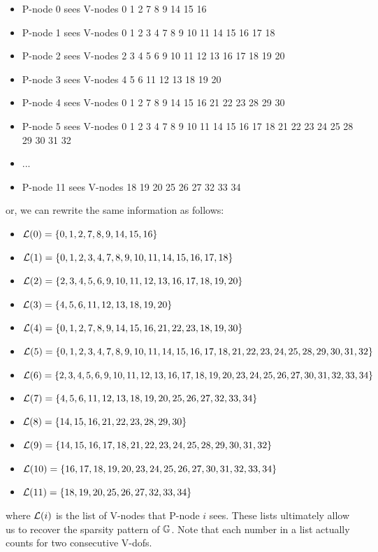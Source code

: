 \begin{itemize}
\item P-node 0 sees V-nodes 0 1 2 7 8 9 14 15 16
\item P-node 1 sees V-nodes 0 1 2 3 4 7 8 9 10 11 14 15 16 17 18 
\item P-node 2 sees V-nodes 2 3 4 5 6 9 10 11 12 13 16 17 18 19 20
\item P-node 3 sees V-nodes 4 5 6 11 12 13 18 19 20
\item P-node 4 sees V-nodes 0 1 2 7 8 9 14 15 16 21 22 23 28 29 30
\item P-node 5 sees V-nodes 0 1 2 3 4 7 8 9 10 11 14 15 16 17 18 21 22 23 24 25 28 29 30 31 32
\item ...
\item P-node 11 sees V-nodes 18 19 20 25 26 27 32 33 34
\end{itemize}
or, we can rewrite the same information as follows:
\begin{itemize}
\item ${\cal L}(0) = \{ 0, 1, 2, 7, 8, 9, 14, 15, 16 \}$
\item ${\cal L}(1) = \{ 0, 1, 2, 3, 4, 7, 8, 9, 10, 11, 14, 15, 16, 17, 18 \}$
\item ${\cal L}(2) = \{ 2, 3, 4, 5, 6, 9, 10, 11, 12, 13, 16, 17, 18, 19, 20 \}$
\item ${\cal L}(3) = \{4,5,6,11,12,13,18,19,20  \}$
\item ${\cal L}(4) = \{0,1,2,7,8,9,14,15,16,21,22,23,18,19,30  \}$
\item ${\cal L}(5) = \{0,1,2,3,4,7,8,9,10,11,14,15,16,17,18,21,22,23,24,25,28,29,30,31,32  \}$
\item ${\cal L}(6) = \{2,3,4,5,6,9,10,11,12,13,16,17,18,19,20,23,24,25,26,27,30,31,32,33,34  \}$
\item ${\cal L}(7) = \{4,5,6,11,12,13,18,19,20,25,26,27,32,33,34  \}$
\item ${\cal L}(8) = \{14,15,16,21,22,23,28,29,30  \}$
\item ${\cal L}(9) = \{14,15,16,17,18,21,22,23,24,25,28,29,30,31,32  \}$
\item ${\cal L}(10) = \{16, 17, 18, 19, 20, 23, 24, 25, 26, 27, 30, 31, 32, 33, 34\}$
\item ${\cal L}(11) = \{18, 19, 20, 25, 26, 27, 32, 33, 34 \}$
\end{itemize}
where ${\cal L}(i)$ is the list of V-nodes that P-node $i$ sees.
These lists ultimately allow us to recover the sparsity pattern of ${\mathbb{G}}$. Note that 
each number in a list actually counts for two consecutive V-dofs.

